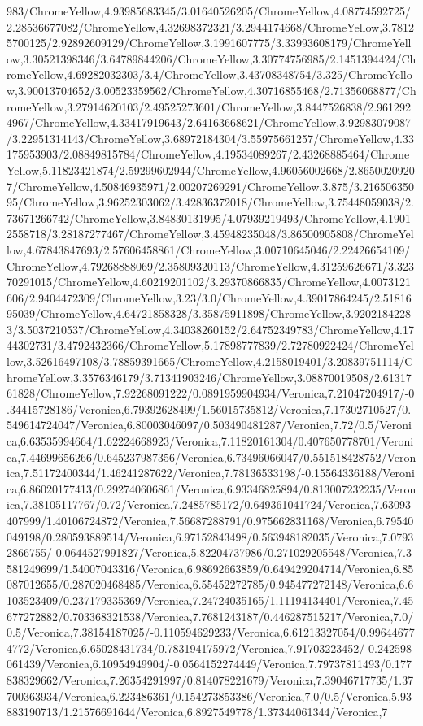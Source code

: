{\begin{tikzternal}
983/ChromeYellow,4.93985683345/3.01640526205/ChromeYellow,4.08774592725/2.28536677082/ChromeYellow,4.32698372321/3.2944174668/ChromeYellow,3.78125700125/2.92892609129/ChromeYellow,3.1991607775/3.33993608179/ChromeYellow,3.30521398346/3.64789844206/ChromeYellow,3.30774756985/2.1451394424/ChromeYellow,4.69282032303/3.4/ChromeYellow,3.43708348754/3.325/ChromeYellow,3.90013704652/3.00523359562/ChromeYellow,4.30716855468/2.71356068877/ChromeYellow,3.27914620103/2.49525273601/ChromeYellow,3.8447526838/2.9612924967/ChromeYellow,4.33417919643/2.64163668621/ChromeYellow,3.92983079087/3.22951314143/ChromeYellow,3.68972184304/3.55975661257/ChromeYellow,4.33175953903/2.08849815784/ChromeYellow,4.19534089267/2.43268885464/ChromeYellow,5.11823421874/2.59299602944/ChromeYellow,4.96056002668/2.86500209207/ChromeYellow,4.50846935971/2.00207269291/ChromeYellow,3.875/3.21650635095/ChromeYellow,3.96252303062/3.42836372018/ChromeYellow,3.75448059038/2.73671266742/ChromeYellow,3.84830131995/4.07939219493/ChromeYellow,4.19012558718/3.28187277467/ChromeYellow,3.45948235048/3.86500905808/ChromeYellow,4.67843847693/2.57606458861/ChromeYellow,3.00710645046/2.22426654109/ChromeYellow,4.79268888069/2.35809320113/ChromeYellow,4.31259626671/3.32370291015/ChromeYellow,4.60219201102/3.29370866835/ChromeYellow,4.0073121606/2.9404472309/ChromeYellow,3.23/3.0/ChromeYellow,4.39017864245/2.5181695039/ChromeYellow,4.64721858328/3.35875911898/ChromeYellow,3.92021842283/3.5037210537/ChromeYellow,4.34038260152/2.64752349783/ChromeYellow,4.1744302731/3.4792432366/ChromeYellow,5.17898777839/2.72780922424/ChromeYellow,3.52616497108/3.78859391665/ChromeYellow,4.2158019401/3.20839751114/ChromeYellow,3.3576346179/3.71341903246/ChromeYellow,3.08870019508/2.6131761828/ChromeYellow,7.92268091222/0.0891959904934/Veronica,7.21047204917/-0.34415728186/Veronica,6.79392628499/1.56015735812/Veronica,7.17302710527/0.549614724047/Veronica,6.80003046097/0.503490481287/Veronica,7.72/0.5/Veronica,6.63535994664/1.62224668923/Veronica,7.11820161304/0.407650778701/Veronica,7.44699656266/0.645237987356/Veronica,6.73496066047/0.551518428752/Veronica,7.51172400344/1.46241287622/Veronica,7.78136533198/-0.15564336188/Veronica,6.86020177413/0.292740606861/Veronica,6.93346825894/0.813007232235/Veronica,7.38105117767/0.72/Veronica,7.2485785172/0.649361041724/Veronica,7.63093407999/1.40106724872/Veronica,7.56687288791/0.975662831168/Veronica,6.79540049198/0.280593889514/Veronica,6.97152843498/0.563948182035/Veronica,7.07932866755/-0.0644527991827/Veronica,5.82204737986/0.271029205548/Veronica,7.3581249699/1.54007043316/Veronica,6.98692663859/0.649429204714/Veronica,6.85087012655/0.287020468485/Veronica,6.55452272785/0.945477272148/Veronica,6.6103523409/0.237179335369/Veronica,7.24724035165/1.11194134401/Veronica,7.45677272882/0.703368321538/Veronica,7.7681243187/0.446287515217/Veronica,7.0/0.5/Veronica,7.38154187025/-0.110594629233/Veronica,6.61213327054/0.996446774772/Veronica,6.65028431734/0.783194175972/Veronica,7.91703223452/-0.242598061439/Veronica,6.10954949904/-0.0564152274449/Veronica,7.79737811493/0.177838329662/Veronica,7.26354291997/0.814078221679/Veronica,7.39046717735/1.37700363934/Veronica,6.223486361/0.154273853386/Veronica,7.0/0.5/Veronica,5.93883190713/1.21576691644/Veronica,6.8927549778/1.37344061344/Veronica,7
\end{tikzternal}}
